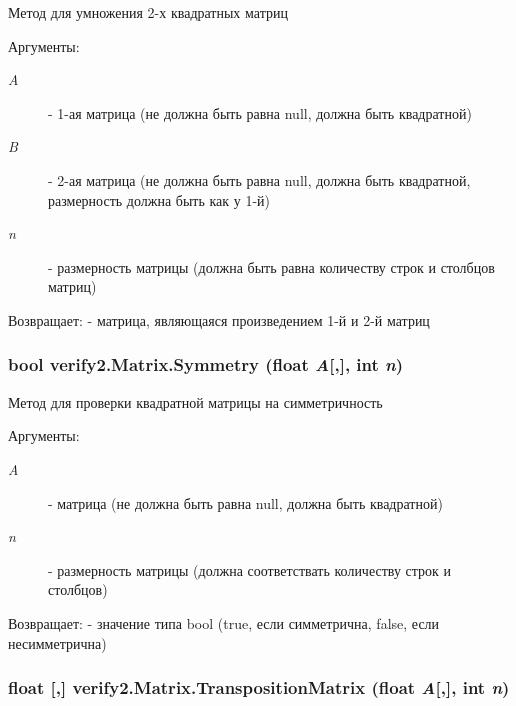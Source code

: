 Метод для умножения 2-х квадратных матриц \begin{Desc}
\item[Аргументы:]
\begin{description}
\item[{\em A}]- 1-ая матрица (не должна быть равна null, должна быть квадратной) \item[{\em B}]- 2-ая матрица (не должна быть равна null, должна быть квадратной, размерность должна быть как у 1-й) \item[{\em n}]- размерность матрицы (должна быть равна количеству строк и столбцов матриц) \end{description}
\end{Desc}
\begin{Desc}
\item[Возвращает:]- матрица, являющаяся произведением 1-й и 2-й матриц \end{Desc}
\hypertarget{classverify2_1_1_matrix_dc85a1e7fe895e0cb096025d72aa82e9}{
\subsubsection[{Symmetry}]{\setlength{\rightskip}{0pt plus 5cm}bool verify2.Matrix.Symmetry (float {\em A}\mbox{[},\mbox{]}, \/  int {\em n})}}
\label{classverify2_1_1_matrix_dc85a1e7fe895e0cb096025d72aa82e9}


Метод для проверки квадратной матрицы на симметричность \begin{Desc}
\item[Аргументы:]
\begin{description}
\item[{\em A}]- матрица (не должна быть равна null, должна быть квадратной) \item[{\em n}]- размерность матрицы (должна соответствать количеству строк и столбцов) \end{description}
\end{Desc}
\begin{Desc}
\item[Возвращает:]- значение типа bool (true, если симметрична, false, если несимметрична) \end{Desc}
\hypertarget{classverify2_1_1_matrix_a53ed5a12d31c2d518c8bec2896d34a6}{
\subsubsection[{TranspositionMatrix}]{\setlength{\rightskip}{0pt plus 5cm}float \mbox{[},\mbox{]} verify2.Matrix.TranspositionMatrix (float {\em A}\mbox{[},\mbox{]}, \/  int {\em n})}}
\label{classverify2_1_1_matrix_a53ed5a12d31c2d518c8bec2896d34a6}


